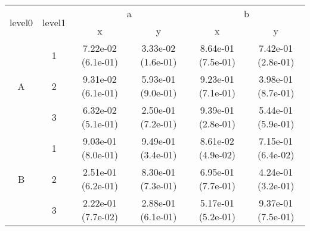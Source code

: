 \begin{tabular}{cccccc}
\toprule
\multirow{2}{*}{level0} & \multirow{2}{*}{level1}&\multicolumn{2}{c}{a}&\multicolumn{2}{c}{b}\tabularnewline
\cmidrule(lr){3-4}
\cmidrule(lr){5-6}
&&x&y&x&y\tabularnewline
\midrule
\multirow{3}{*}{A}&1& 7.22e-02 (6.1e-01)& 3.33e-02 (1.6e-01)& 8.64e-01 (7.5e-01)& 7.42e-01 (2.8e-01)\tabularnewline
&2& 9.31e-02 (6.1e-01)& 5.93e-01 (9.0e-01)& 9.23e-01 (7.1e-01)& 3.98e-01 (8.7e-01)\tabularnewline
&3& 6.32e-02 (5.1e-01)& 2.50e-01 (7.2e-01)& 9.39e-01 (2.8e-01)& 5.44e-01 (5.9e-01)\tabularnewline
\midrule
\multirow{3}{*}{B}&1& 9.03e-01 (8.0e-01)& 9.49e-01 (3.4e-01)& 8.61e-02 (4.9e-02)& 7.15e-01 (6.4e-02)\tabularnewline
&2& 2.51e-01 (6.2e-01)& 8.30e-01 (7.3e-01)& 6.95e-01 (7.7e-01)& 4.24e-01 (3.2e-01)\tabularnewline
&3& 2.22e-01 (7.7e-02)& 2.88e-01 (6.1e-01)& 5.17e-01 (5.2e-01)& 9.37e-01 (7.5e-01)\tabularnewline
\bottomrule
\end{tabular}
